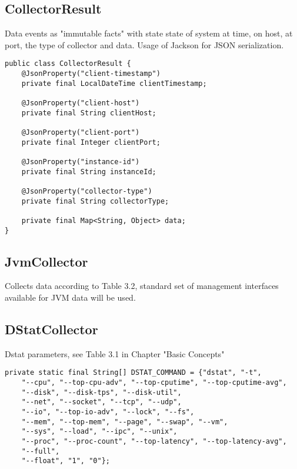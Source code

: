 \subsection{CollectorResult}

Data events as "immutable facts" with state state of system at time, on host, at port, the type of collector and data.
Usage of Jackson for JSON serialization.

\begin{lstlisting}[caption={CollectorResult}, captionpos=b, label={lst:collectortypesimpl}]
public class CollectorResult {
    @JsonProperty("client-timestamp")
    private final LocalDateTime clientTimestamp;

    @JsonProperty("client-host")
    private final String clientHost;

    @JsonProperty("client-port")
    private final Integer clientPort;

    @JsonProperty("instance-id")
    private final String instanceId;

    @JsonProperty("collector-type")
    private final String collectorType;

    private final Map<String, Object> data;
}
\end{lstlisting}

\subsection{JvmCollector}

Collects data according to Table 3.2, standard set of management interfaces available for JVM data will be used.

\subsection{DStatCollector}

Dstat parameters, see Table 3.1 in Chapter "Basic Concepts"

\begin{lstlisting}[caption={Dstat program parameters in "DstatCollector"}, captionpos=b, label={lst:dstatparameters}]
private static final String[] DSTAT_COMMAND = {"dstat", "-t",
    "--cpu", "--top-cpu-adv", "--top-cputime", "--top-cputime-avg",
    "--disk", "--disk-tps", "--disk-util",
    "--net", "--socket", "--tcp", "--udp",
    "--io", "--top-io-adv", "--lock", "--fs",
    "--mem", "--top-mem", "--page", "--swap", "--vm",
    "--sys", "--load", "--ipc", "--unix",
    "--proc", "--proc-count", "--top-latency", "--top-latency-avg",
    "--full",
    "--float", "1", "0"};
\end{lstlisting}

